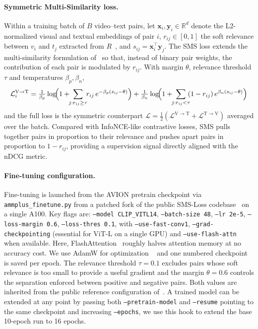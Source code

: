 \paragraph{Symmetric Multi-Similarity loss.}
Within a training batch of $B$ video--text pairs, let $\mathbf{x}_i, \mathbf{y}_i \in \mathbb{R}^d$ denote the L2-normalized visual and textual embeddings of pair $i$, $r_{ij} \in [0,1]$ the soft relevance between $v_i$ and $t_j$ extracted from $R$~\cite{wray2021semantic}, and $s_{ij} = \mathbf{x}_i^{\!\top}\mathbf{y}_j$. The SMS loss extends the multi-similarity formulation of~\cite{wang2019multisimilarity} so that, instead of binary pair weights, the contribution of each pair is modulated by $r_{ij}$. With margin $\theta$, relevance threshold $\tau$ and temperatures $\beta_p, \beta_n$,
\begin{dmath}
\mathcal{L}^{\mathrm{V\to T}}_i = \tfrac{1}{\beta_p}\log\!\Bigl(1 + \!\!\sum_{j: r_{ij}\ge \tau}\!\! r_{ij}\,e^{-\beta_p(s_{ij}-\theta)}\Bigr) + \tfrac{1}{\beta_n}\log\!\Bigl(1 + \!\!\sum_{j: r_{ij}<\tau}\!\! (1-r_{ij})\,e^{\beta_n(s_{ij}-\theta)}\Bigr)
\label{eq:sms}
\end{dmath}
and the full loss is the symmetric counterpart $\mathcal{L} = \tfrac{1}{2}(\mathcal{L}^{\mathrm{V\to T}} + \mathcal{L}^{\mathrm{T\to V}})$ averaged over the batch. Compared with InfoNCE-like contrastive losses, SMS pulls together pairs in proportion to their relevance and pushes apart pairs in proportion to $1 - r_{ij}$, providing a supervision signal directly aligned with the nDCG metric.

\paragraph{Fine-tuning configuration.}
Fine-tuning is launched from the AVION pretrain checkpoint via \texttt{ammplus\_finetune.py} from a patched fork of the public SMS-Loss codebase~\cite{wang2024smsloss_repo} on a single A100. Key flags are: \texttt{--model CLIP\_VITL14}, \texttt{--batch-size 48}, \texttt{--lr 2e-5}, \texttt{--loss-margin 0.6}, \texttt{--loss-thres 0.1}, with \texttt{--use-fast-conv1}, \texttt{--grad-checkpointing} (essential for ViT-L on a single GPU) and \texttt{--use-flash-attn} when available. Here, FlashAttention~\cite{dao2022flashattention} roughly halves attention memory at no accuracy cost. We use AdamW for optimization ~\cite{loshchilov2019adamw} and one numbered checkpoint is saved per epoch. The relevance threshold $\tau = 0.1$ excludes pairs whose soft relevance is too small to provide a useful gradient and the margin $\theta = 0.6$ controls the separation enforced between positive and negative pairs. Both values are inherited from the public reference configuration of~\cite{wang2024symmetricmultisimilaritylossepickitchens100}. A trained model can be extended at any point by passing both \texttt{--pretrain-model} and \texttt{--resume} pointing to the same checkpoint and increasing \texttt{--epochs}, we use this hook to extend the base 10-epoch run to 16 epochs.

